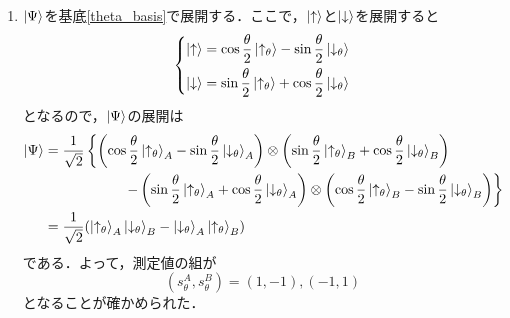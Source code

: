 \documentclass[a4paper,pdflatex,ja=standard]{bxjsarticle}
\begin{document}
\begin{enumerate}
  \item 
  $\ket{\Psi}$を基底\eqref{theta_basis}で展開する．ここで，$\ket{\uparrow}$と$\ket{\downarrow}$を展開すると
  \begin{equation}
    \begin{dcases}
      \ket{\uparrow} 
      =
      \cos\frac{\theta}{2}
      \ket{\uparrow_{\theta}}
      -
      \sin\frac{\theta}{2}
      \ket{\downarrow_{\theta}}
      \\
      \ket{\downarrow}
      =
      \sin\frac{\theta}{2}
      \ket{\uparrow_{\theta}}
      +
      \cos\frac{\theta}{2}
      \ket{\downarrow_{\theta}}
    \end{dcases}
  \end{equation}
  となるので，$\ket{\Psi}$の展開は
  \begin{align}
    \ket{\Psi}
    &=
    \frac{1}{\sqrt{2}}
    \left\{ 
    \left( \cos\frac{\theta}{2}
    \ket{\uparrow_{\theta}}_{A}
    -
    \sin\frac{\theta}{2}
    \ket{\downarrow_{\theta}}_{A}\right)\otimes
    \left( \sin\frac{\theta}{2}
    \ket{\uparrow_{\theta}}_{B}
    +
    \cos\frac{\theta}{2}
    \ket{\downarrow_{\theta}}_{B} \right)
    \right.
    \nonumber
    \\
    &\hspace*{2cm}\left.
    -
    \left( \sin\frac{\theta}{2}
    \ket{\uparrow_{\theta}}_{A}
    +
    \cos\frac{\theta}{2}
    \ket{\downarrow_{\theta}}_{A} \right)\otimes
    \left( \cos\frac{\theta}{2}
    \ket{\uparrow_{\theta}}_{B}
    -
    \sin\frac{\theta}{2}
    \ket{\downarrow_{\theta}}_{B} \right)
    \right\}
    \nonumber
    \\
    &=
    \frac{1}{\sqrt{2}}(\ket{\uparrow_{\theta}}_{A}\ket{\downarrow_{\theta}}_{B}-\ket{\downarrow_{\theta}}_{A}\ket{\uparrow_{\theta}}_{B})
  \end{align}
  である．よって，測定値の組が
  \begin{equation}
    (s_{\theta}^{A},s_{\theta}^{B})
    =
    (1,-1),(-1,1)
  \end{equation}
  となることが確かめられた．


\end{enumerate}
\end{document}
